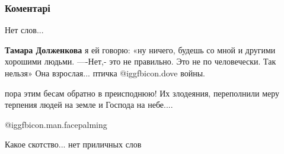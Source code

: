  
 
 
 
 
\subsubsection{Коментарі}

\begin{itemize} %
Нет слов...

\begin{itemize} %
\textbf{Тамара Долженкова}
я ей говорю: «ну ничего, будешь со мной и другими хорошими людьми.
—-Нет,- это не правильно. Это не по человечески.
Так нельзя»
Она взрослая... птичка @igg{fbicon.dove} войны.
\end{itemize} %


пора этим бесам обратно в преисподнюю! Их злодеяния, переполнили меру терпения
людей на земле и Господа на небе....

 @igg{fbicon.man.facepalming} 


Какое скотство... нет приличных слов

\end{itemize} %
